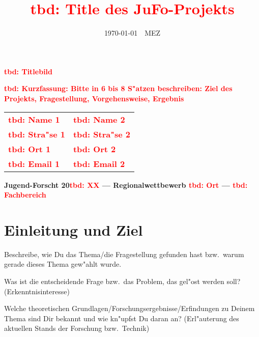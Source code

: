 \documentclass[10pt,twoside]{article}  %
\newcommand{\tbd}[1]{\textcolor{red}{\large \bf tbd: #1}}
\begin{document}
  \title{\tbd{Title des JuFo-Projekts}}
  \setlength{\parskip}{0ex}
  \date{\today \ \currenttime \ MEZ}
  \maketitle
  \begin{center}
    \tbd{Titlebild}
  \end{center}

  \hrulefill

  \tbd{Kurzfassung: Bitte in 6 bis 8 S"atzen beschreiben: Ziel des Projekts,
    Fragestellung, Vorgehensweise, Ergebnis} %

  \hrulefill

  \vfill
  \begin{tabular}{C{0.5\textwidth}C{0.5\textwidth}}
    \textbf{\tbd{Name 1}}    & \textbf{\tbd{Name 2}} \\
    \textbf{\tbd{Stra"se 1}} & \textbf{\tbd{Stra"se 2}} \\
    \textbf{\tbd{Ort 1}}     & \textbf{\tbd{Ort 2}} \\
    \textbf{\tbd{Email 1}}   & \textbf{\tbd{Email 2}} \\
  \end{tabular}
  \vfill

  \hrulefill

  \parbox{\textwidth}{\centering \bf Jugend-Forscht 20\tbd{XX} ---
    Regionalwettbewerb \tbd{Ort} --- \tbd{Fachbereich}}
  \thispagestyle{empty}
  \newpage

  \tableofcontents
  \listoffigures
  \listoftables
  \setlength{\parskip}{1ex}
  \cleardoublepage


  \section{Einleitung und Ziel} %
    Beschreibe, wie Du das Thema/die Fragestellung gefunden hast bzw.\ warum
    gerade dieses Thema gew"ahlt wurde.

    Was ist die entscheidende Frage bzw.\ das Problem, das gel"ost werden soll?
    (Erkenntnisinteresse)

    Welche theoretischen Grundlagen/Forschungsergebnisse/Erfindungen zu Deinem
    Thema sind Dir bekannt und wie kn"upfst Du daran an? (Erl"auterung des
    aktuellen Stands der Forschung bzw.\ Technik)
\end{document}
